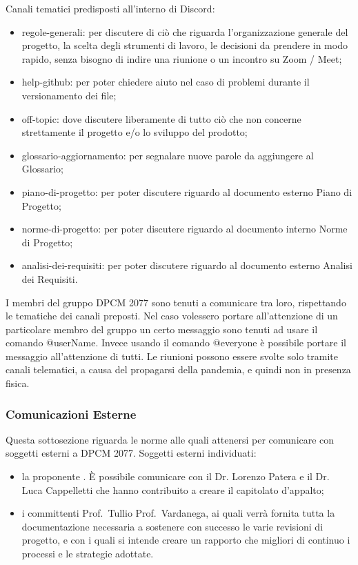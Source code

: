 Canali tematici predisposti all'interno di Discord:
\begin{itemize}
\item{regole-generali: per discutere di ciò che riguarda l’organizzazione generale del progetto, la scelta degli strumenti di lavoro, le decisioni da prendere in modo rapido, senza bisogno di indire una riunione o un incontro  su Zoom / Meet;}
\item{help-github: per poter chiedere aiuto nel caso di problemi durante il versionamento dei file;}
\item{off-topic: dove discutere liberamente di tutto ciò che non concerne strettamente il progetto e/o lo sviluppo del prodotto;}
\item{glossario-aggiornamento: per segnalare nuove parole da aggiungere al Glossario;}
\item{piano-di-progetto: per poter discutere riguardo al documento esterno Piano di Progetto;}
\item{norme-di-progetto: per poter discutere riguardo al documento interno Norme di Progetto;}
\item{analisi-dei-requisiti: per poter discutere riguardo al documento esterno Analisi dei Requisiti.}
\end{itemize}
I membri del gruppo DPCM 2077 sono tenuti a comunicare tra loro, rispettando le tematiche dei canali preposti. Nel caso volessero portare all’attenzione di un particolare membro del gruppo un certo messaggio sono tenuti ad usare
il comando @userName.
Invece usando il comando @everyone è possibile portare il messaggio all'attenzione di tutti.
Le riunioni possono essere svolte solo tramite canali telematici, a causa del propagarsi della pandemia, e quindi non in presenza fisica.

\subsubsection{Comunicazioni Esterne}
Questa sottosezione riguarda le norme alle quali attenersi per comunicare con soggetti esterni a DPCM 2077.
Soggetti esterni individuati:
\begin{itemize}
\item{la proponente . È possibile comunicare con il Dr. Lorenzo Patera e il Dr. Luca Cappelletti che hanno contribuito a creare il capitolato d'appalto;}
\item{i committenti Prof.~Tullio Prof.~Vardanega, ai quali verrà fornita tutta la documentazione necessaria a sostenere con successo le varie revisioni di progetto, e con i quali si intende creare un rapporto che migliori 
di continuo i processi e le strategie adottate.}
\end{itemize}

